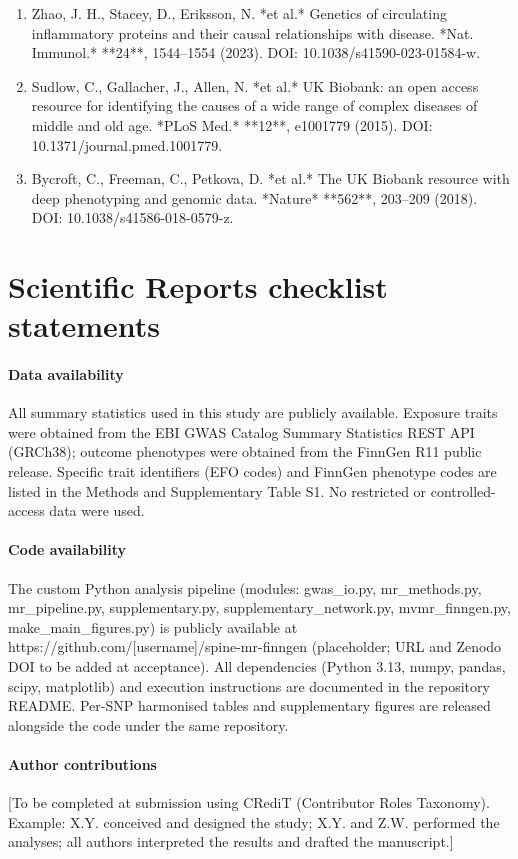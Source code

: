 \documentclass[11pt]{article}
\begin{document}
\begin{enumerate}
\item Zhao, J. H., Stacey, D., Eriksson, N. *et al.* Genetics of circulating inflammatory proteins and their causal relationships with disease. *Nat. Immunol.* **24**, 1544--1554 (2023). DOI: 10.1038/s41590-023-01584-w.
\item Sudlow, C., Gallacher, J., Allen, N. *et al.* UK Biobank: an open access resource for identifying the causes of a wide range of complex diseases of middle and old age. *PLoS Med.* **12**, e1001779 (2015). DOI: 10.1371/journal.pmed.1001779.
\item Bycroft, C., Freeman, C., Petkova, D. *et al.* The UK Biobank resource with deep phenotyping and genomic data. *Nature* **562**, 203--209 (2018). DOI: 10.1038/s41586-018-0579-z.
\end{enumerate}
\section*{Scientific Reports checklist statements}
\paragraph{Data availability} All summary statistics used in this study are publicly available. Exposure traits were obtained from the EBI GWAS Catalog Summary Statistics REST API (GRCh38); outcome phenotypes were obtained from the FinnGen R11 public release. Specific trait identifiers (EFO codes) and FinnGen phenotype codes are listed in the Methods and Supplementary Table S1. No restricted or controlled-access data were used.
\paragraph{Code availability} The custom Python analysis pipeline (modules: gwas\_io.py, mr\_methods.py, mr\_pipeline.py, supplementary.py, supplementary\_network.py, mvmr\_finngen.py, make\_main\_figures.py) is publicly available at https://github.com/[username]/spine-mr-finngen (placeholder; URL and Zenodo DOI to be added at acceptance). All dependencies (Python 3.13, numpy, pandas, scipy, matplotlib) and execution instructions are documented in the repository README. Per-SNP harmonised tables and supplementary figures are released alongside the code under the same repository.
\paragraph{Author contributions} [To be completed at submission using CRediT (Contributor Roles Taxonomy). Example: X.Y. conceived and designed the study; X.Y. and Z.W. performed the analyses; all authors interpreted the results and drafted the manuscript.]
\end{document}
